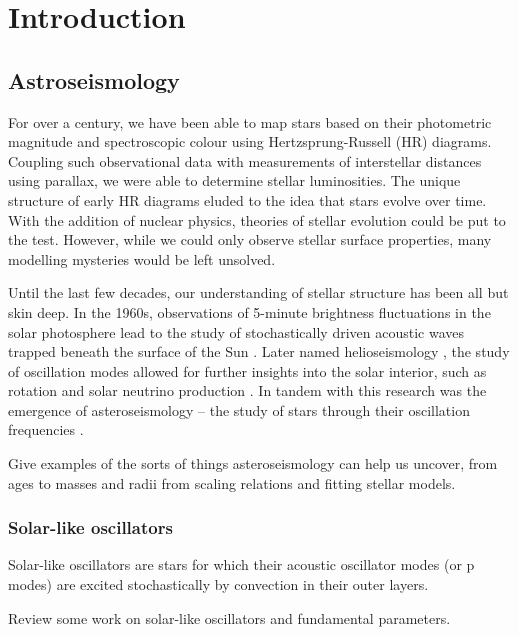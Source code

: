 \chapter{Introduction}

\section{Astroseismology}

For over a century, we have been able to map stars based on their photometric magnitude and spectroscopic colour using Hertzsprung-Russell (HR) diagrams. Coupling such observational data with measurements of interstellar distances using parallax, we were able to determine stellar luminosities. The unique structure of early HR diagrams eluded to the idea that stars evolve over time. With the addition of nuclear physics, theories of stellar evolution could be put to the test. However, while we could only observe stellar surface properties, many modelling mysteries would be left unsolved.

Until the last few decades, our understanding of stellar structure has been all but skin deep. In the 1960s, observations of 5-minute brightness fluctuations in the solar photosphere lead to the study of stochastically driven acoustic waves trapped beneath the surface of the Sun \citep{Ulrich1970, Ando.Osaki1975}. Later named helioseismology \citep{Deubner.Gough1984}, the study of oscillation modes allowed for further insights into the solar interior, such as rotation \citep{Deubner.Ulrich.ea1979} and solar neutrino production \citep{Bahcall.Ulrich1988}. In tandem with this research was the emergence of asteroseismology -- the study of stars through their oscillation frequencies \citep{Christensen-Dalsgaard1984}.

Give examples of the sorts of things asteroseismology can help us uncover, from ages \citep[see, e.g.]{Ulrich1986, Soderblom2010, SilvaAguirre.Davies.ea2015} to masses and radii from scaling relations \citep{} and fitting stellar models\citep{}.

\subsection{Solar-like oscillators}

Solar-like oscillators are stars for which their acoustic oscillator modes (or p modes) are excited stochastically by convection in their outer layers.

Review some work on solar-like oscillators and fundamental parameters.

